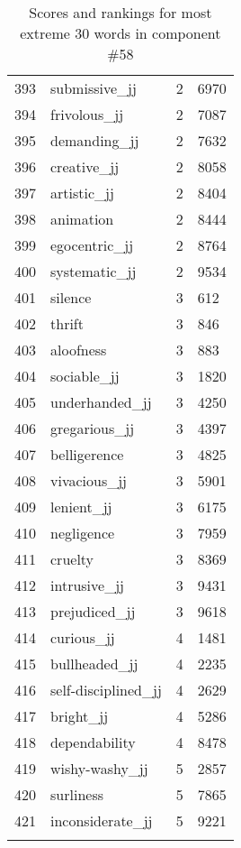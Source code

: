 \begin{longtable}[!htbp]{| rlr@{.}l |}
    393 & submissive\_jj & 2 & 6970 \\
    394 & frivolous\_jj & 2 & 7087 \\
    395 & demanding\_jj & 2 & 7632 \\
    396 & creative\_jj & 2 & 8058 \\
    397 & artistic\_jj & 2 & 8404 \\
    398 & animation & 2 & 8444 \\
    399 & egocentric\_jj & 2 & 8764 \\
    400 & systematic\_jj & 2 & 9534 \\
    401 & silence & 3 & 612 \\
    402 & thrift & 3 & 846 \\
    403 & aloofness & 3 & 883 \\
    404 & sociable\_jj & 3 & 1820 \\
    405 & underhanded\_jj & 3 & 4250 \\
    406 & gregarious\_jj & 3 & 4397 \\
    407 & belligerence & 3 & 4825 \\
    408 & vivacious\_jj & 3 & 5901 \\
    409 & lenient\_jj & 3 & 6175 \\
    410 & negligence & 3 & 7959 \\
    411 & cruelty & 3 & 8369 \\
    412 & intrusive\_jj & 3 & 9431 \\
    413 & prejudiced\_jj & 3 & 9618 \\
    414 & curious\_jj & 4 & 1481 \\
    415 & bullheaded\_jj & 4 & 2235 \\
    416 & self-disciplined\_jj & 4 & 2629 \\
    417 & bright\_jj & 4 & 5286 \\
    418 & dependability & 4 & 8478 \\
    419 & wishy-washy\_jj & 5 & 2857 \\
    420 & surliness & 5 & 7865 \\
    421 & inconsiderate\_jj & 5 & 9221 \\
    \hline
    \caption{Scores and rankings for most extreme 30 words in component \#58} \\
\end{longtable}
